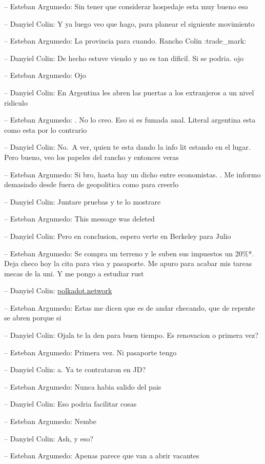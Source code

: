 -- Esteban Argumedo: Sin tener que considerar hospedaje esta muy bueno
eso

-- Danyiel Colin: Y ya luego veo que hago, para planear el siguiente
movimiento

-- Esteban Argumedo: La provincia para cuando. Rancho Colin
:trade\_mark:

-- Danyiel Colin: De hecho estuve viendo y no es tan dificil. Si se
podria. ojo

-- Esteban Argumedo: Ojo

-- Danyiel Colin: En Argentina les abren las puertas a los extranjeros a
un nivel ridiculo

-- Esteban Argumedo: . No lo creo. Eso si es fumada anal. Literal
argentina esta como esta por lo contrario

-- Danyiel Colin: No.~A ver, quien te esta dando la info lit estando en
el lugar. Pero bueno, veo los papeles del rancho y entonces veras

-- Esteban Argumedo: Si bro, hasta hay un dicho entre economistas. . Me
informo demasiado desde fuera de geopolitica como para creerlo

-- Danyiel Colin: Juntare pruebas y te lo mostrare

-- Esteban Argumedo: This message was deleted

-- Danyiel Colin: Pero en conclusion, espero verte en Berkeley para
Julio

-- Esteban Argumedo: Se compra un terreno y le suben sus impuestos un
20\%*. Deja checo hoy la cita para visa y pasaporte. Me apuro para
acabar mis tareas mecas de la uni. Y me pongo a estudiar rust

-- Danyiel Colin:
\href{https://polkadot.network/development/academy/}{polkadot.network}

-- Esteban Argumedo: Estas me dicen que es de andar checando, que de
repente se abren porque si

-- Danyiel Colin: Ojala te la den para buen tiempo. Es renovacion o
primera vez?

-- Esteban Argumedo: Primera vez. Ni pasaporte tengo

-- Danyiel Colin: a. Ya te contrataron en JD?

-- Esteban Argumedo: Nunca habia salido del pais

-- Danyiel Colin: Eso podria facilitar cosas

-- Esteban Argumedo: Nembe

-- Danyiel Colin: Ash, y eso?

-- Esteban Argumedo: Apenas parece que van a abrir vacantes

